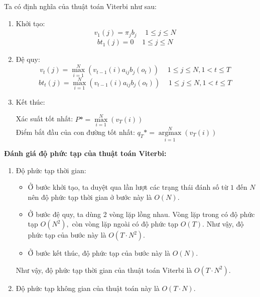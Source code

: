 Ta có định nghĩa của thuật toán Viterbi như sau:
\begin{enumerate}
\item Khởi tạo:
$${v_1}\left( j \right) = {\pi _j}{b_j}\begin{array}{*{20}{c}}
  {}&{1 \leqslant j \leqslant N} 
\end{array}$$
$$b{t_1}\left( j \right) = 0\begin{array}{*{20}{c}}
  {}&{1 \leqslant j \leqslant N} 
\end{array}$$
\item Đệ quy:
$${v_t}\left( j \right) = \mathop {\max }\limits_{i = 1}^N \left( {v{}_{t - 1}\left( i \right){a_{ij}}{b_j}\left( {{o_t}} \right)} \right)\begin{array}{*{20}{c}}
  {}&{1 \leqslant j \leqslant N,1 < t \leqslant T} 
\end{array}$$
$$b{t_t}\left( j \right) = \mathop {\max }\limits_{i = 1}^N \left( {v{}_{t - 1}\left( i \right){a_{ij}}{b_j}\left( {{o_t}} \right)} \right)\begin{array}{*{20}{c}}
  {}&{1 \leqslant j \leqslant N,1 < t \leqslant T} 
\end{array}$$
\item Kết thúc:\\
\begin{center}
Xác suất tốt nhất: $P* = \mathop {\max }\limits_{i = 1}^N \left( {{v_T}\left( i \right)} \right)$\\
Điểm bắt đầu của con đường tốt nhất: $q_T* = \mathop {\arg \max }\limits_{i = 1}^N \left( {{v_T}\left( i \right)} \right)$
\end{center}
\end{enumerate}
\textbf{Đánh giá độ phức tạp của thuật toán Viterbi:}
\begin{enumerate}
\item Độ phức tạp thời gian:
\begin{itemize}
\item Ở bước khởi tạo, ta duyệt qua lần lượt các trạng thái đánh số từ $1$ đến $N$ nên độ phức tạp thời gian ở bước này là $O \left( N \right).$
\item Ở bước đệ quy, ta dùng 2 vòng lặp lồng nhau. Vòng lặp trong có độ phức tạp  $O \left( N^2 \right),$ còn vòng lặp ngoài có độ phức tạp  $O \left( T \right).$ Như vậy, độ phức tạp của bước này là $O \left( {T \cdot N^2} \right).$
\item Ở bước kết thúc, độ phức tạp của bước này là $O \left( N \right).$ 
\end{itemize}
Như vậy, độ phức tạp thời gian của thuật toán Viterbi là $O \left( {T \cdot N^2} \right).$
\item Độ phức tạp không gian của thuật toán này là $O \left( {T \cdot N} \right).$
\end{enumerate}

